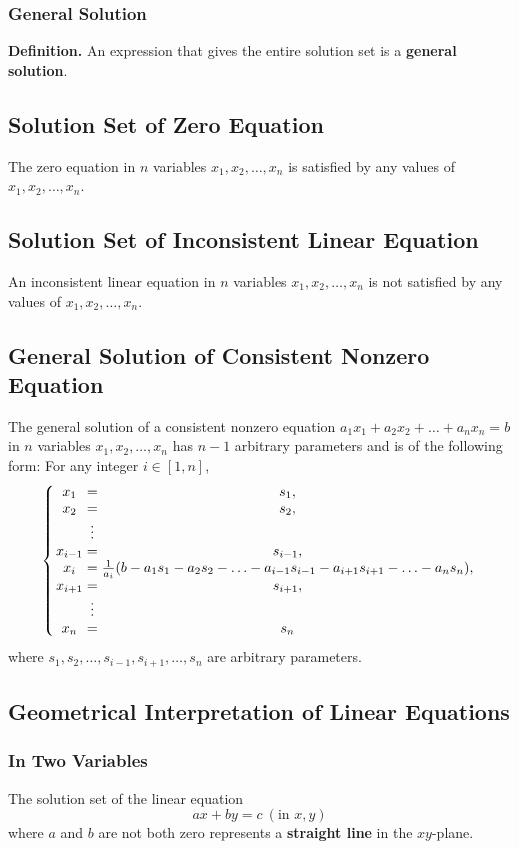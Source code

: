 \documentclass[../ma2001_notes.tex]{subfiles}
\begin{document}
\subsubsection{General Solution}
\textbf{Definition.} An expression that gives the entire solution set is a \textbf{general solution}.

\subsection{Solution Set of Zero Equation}
The zero equation in \(n\) variables \(x_1, x_2,\ldots, x_n\) is satisfied by any values of \(x_1, x_2, \ldots, x_n\).

\subsection{Solution Set of Inconsistent Linear Equation}
An inconsistent linear equation in \(n\) variables \(x_1, x_2,\ldots, x_n\) is not satisfied by any values of \(x_1, x_2, \ldots, x_n\).

\subsection{General Solution of Consistent Nonzero Equation}
The general solution of a consistent nonzero equation \(a_1x_1+a_2x_2+\ldots+a_nx_n=b\) in \(n\) variables \(x_1, x_2, \ldots, x_n\) has \(n-1\) arbitrary parameters and is of the following form: For any integer \(i\in[1,n]\),
\[\left\{
\arraycolsep=1.4pt
\begin{array}{ccc}
	x_1 & = & s_1, \\
	x_2 & = & s_2, \\
	& \vdots & \\
	x_{i-1} & = & s_{i-1}, \\
	x_i & = & \frac{1}{a_i}(b-a_1s_1-a_2s_2-\ldots-a_{i-1}s_{i-1}-a_{i+1}s_{i+1}-\ldots-a_ns_n),\\
	x_{i+1} & = & s_{i+1}, \\
	& \vdots & \\
	x_n & = & s_n
\end{array}\right.
\]
where \(s_1,s_2,\ldots,s_{i-1},s_{i+1},\ldots,s_n\) are arbitrary parameters.

\subsection{Geometrical Interpretation of Linear Equations}
\subsubsection{In Two Variables}
The solution set of the linear equation
\[ax+by=c\ (\text{in }x,y)\]
where \(a\) and \(b\) are not both zero represents a \textbf{straight line} in the \(xy\)-plane.
\end{document}
